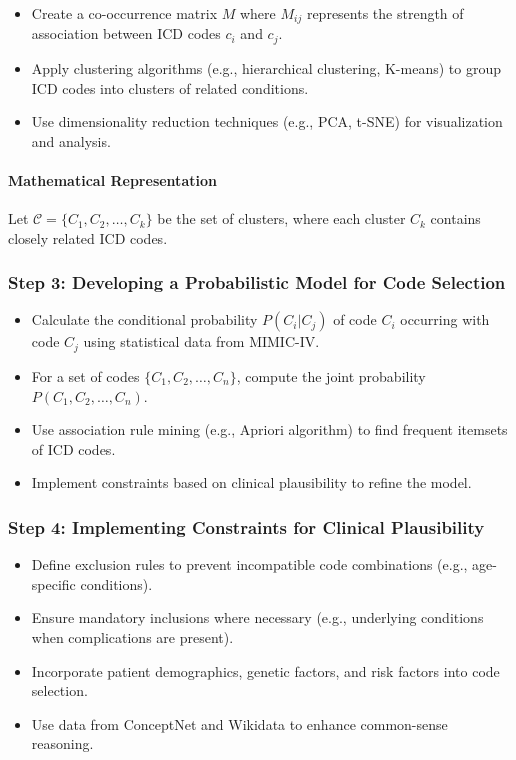 \documentclass[12pt, a4paper]{article}
\begin{document}
\begin{itemize}
    \item Create a co-occurrence matrix \( M \) where \( M_{ij} \) represents the strength of association between ICD codes \( c_i \) and \( c_j \).
    \item Apply clustering algorithms (e.g., hierarchical clustering, K-means) to group ICD codes into clusters of related conditions.
    \item Use dimensionality reduction techniques (e.g., PCA, t-SNE) for visualization and analysis.
\end{itemize}

\paragraph{Mathematical Representation}

Let \( \mathcal{C} = \{C_1, C_2, \dots, C_k\} \) be the set of clusters, where each cluster \( C_k \) contains closely related ICD codes.

\subsubsection{Step 3: Developing a Probabilistic Model for Code Selection}

\begin{itemize}
    \item Calculate the conditional probability \( P(C_i | C_j) \) of code \( C_i \) occurring with code \( C_j \) using statistical data from MIMIC-IV.
    \item For a set of codes \( \{C_1, C_2, \dots, C_n\} \), compute the joint probability \( P(C_1, C_2, \dots, C_n) \).
    \item Use association rule mining (e.g., Apriori algorithm) to find frequent itemsets of ICD codes.
    \item Implement constraints based on clinical plausibility to refine the model.
\end{itemize}

\subsubsection{Step 4: Implementing Constraints for Clinical Plausibility}

\begin{itemize}
    \item Define exclusion rules to prevent incompatible code combinations (e.g., age-specific conditions).
    \item Ensure mandatory inclusions where necessary (e.g., underlying conditions when complications are present).
    \item Incorporate patient demographics, genetic factors, and risk factors into code selection.
    \item Use data from ConceptNet and Wikidata to enhance common-sense reasoning.
\end{itemize}
\end{document}
